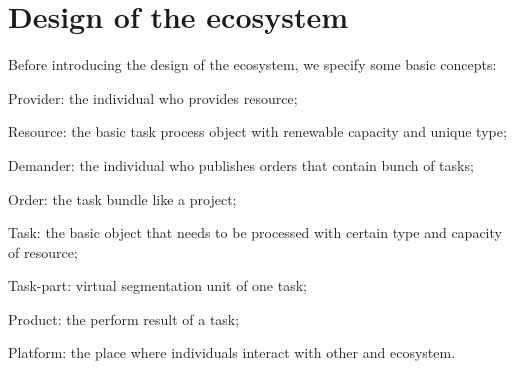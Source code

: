 \section{Design of the ecosystem} %
\label{sec:design_of_the_ecosystem}
Before introducing the design of the ecosystem, we specify some basic concepts:
\begin{compactitem}
	\item Provider: the individual who provides resource;
	\item Resource: the basic task process object with renewable capacity and unique type;
	\item Demander: the individual who publishes orders that contain bunch of tasks;
	\item Order: the task bundle like a project;
	\item Task: the basic object that needs to be processed with certain type and capacity of resource;
	\item Task-part: virtual segmentation unit of one task;
	\item Product: the perform result of a task;
	\item Platform: the place where individuals interact with other and ecosystem.
\end{compactitem}

